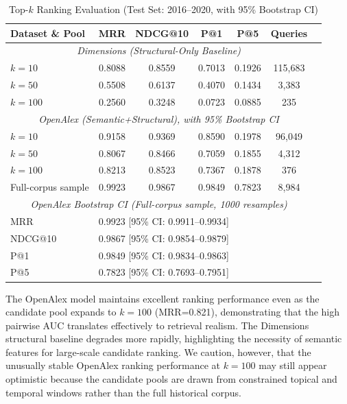 \documentclass[11pt,a4paper]{article}
\begin{document}
\begin{table}[H]
\centering
\caption{Top-$k$ Ranking Evaluation (Test Set: 2016--2020, with 95\% Bootstrap CI)}
\label{tab:ranking}
\begin{tabular}{lcccccc}
\toprule
\textbf{Dataset \& Pool} & \textbf{MRR} & \textbf{NDCG@10} & \textbf{P@1} & \textbf{P@5} & \textbf{Queries} \\
\midrule
\multicolumn{6}{c}{\textit{Dimensions (Structural-Only Baseline)}} \\
$k=10$ & 0.8088 & 0.8559 & 0.7013 & 0.1926 & 115,683 \\
$k=50$ & 0.5508 & 0.6137 & 0.4070 & 0.1434 & 3,383 \\
$k=100$ & 0.2560 & 0.3248 & 0.0723 & 0.0885 & 235 \\
\midrule
\multicolumn{6}{c}{\textit{OpenAlex (Semantic+Structural), with 95\% Bootstrap CI}} \\
$k=10$ & 0.9158 & 0.9369 & 0.8590 & 0.1978 & 96,049 \\
$k=50$ & 0.8067 & 0.8466 & 0.7059 & 0.1855 & 4,312 \\
$k=100$ & 0.8213 & 0.8523 & 0.7367 & 0.1878 & 376 \\
Full-corpus sample & 0.9923 & 0.9867 & 0.9849 & 0.7823 & 8,984 \\
\midrule
\multicolumn{6}{c}{\textit{OpenAlex Bootstrap CI (Full-corpus sample, 1000 resamples)}} \\
MRR & \multicolumn{5}{l}{0.9923 [95\% CI: 0.9911--0.9934]} \\
NDCG@10 & \multicolumn{5}{l}{0.9867 [95\% CI: 0.9854--0.9879]} \\
P@1 & \multicolumn{5}{l}{0.9849 [95\% CI: 0.9834--0.9863]} \\
P@5 & \multicolumn{5}{l}{0.7823 [95\% CI: 0.7693--0.7951]} \\
\bottomrule
\end{tabular}
\end{table}

The OpenAlex model maintains excellent ranking performance even as the candidate pool expands to $k=100$ (MRR=0.821), demonstrating that the high pairwise AUC translates effectively to retrieval realism. The Dimensions structural baseline degrades more rapidly, highlighting the necessity of semantic features for large-scale candidate ranking. We caution, however, that the unusually stable OpenAlex ranking performance at $k=100$ may still appear optimistic because the candidate pools are drawn from constrained topical and temporal windows rather than the full historical corpus.
\end{document}
